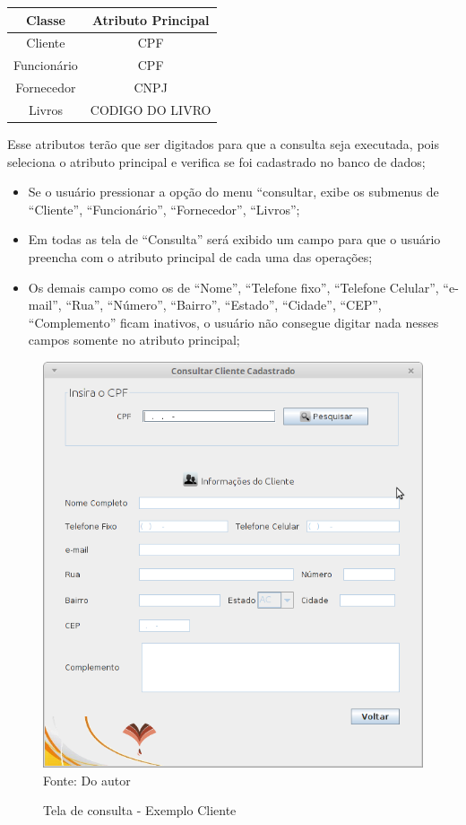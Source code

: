 \begin{table}[H]
\centering
\begin{tabular}{|c|c|}\hline
\textbf{Classe} & \textbf{Atributo Principal}\\\hline
Cliente & CPF\\\hline
Funcionário & CPF\\\hline
Fornecedor & CNPJ\\\hline
Livros & CODIGO DO LIVRO\\\hline
\end{tabular}
\end{table}

Esse atributos terão que ser digitados para que a consulta seja executada, pois seleciona o atributo principal
e verifica se foi cadastrado no banco de dados;

\begin{itemize}
 \item Se o usuário pressionar a opção do menu “consultar, exibe os submenus de “Cliente”, “Funcionário”, “Fornecedor”, “Livros”;


 \item Em todas as tela de “Consulta” será exibido um campo para que o usuário preencha com o atributo principal de cada uma das operações;

 \item Os demais campo como os de “Nome”,  “Telefone fixo”, “Telefone Celular”, “e-mail”, “Rua”, “Número”, “Bairro”, “Estado”, “Cidade”, “CEP”, “Complemento” ficam inativos, o usuário não consegue digitar nada nesses campos somente no atributo principal;
\end{itemize}

\begin{figure}[H]
	\centering 
	\caption{Tela de consulta - Exemplo Cliente}
	\label{consulta_cliente}
	\includegraphics[scale = 0.6]{imagens/tela-consulta-cliente.png}
	\\Fonte: Do autor
\end{figure}


